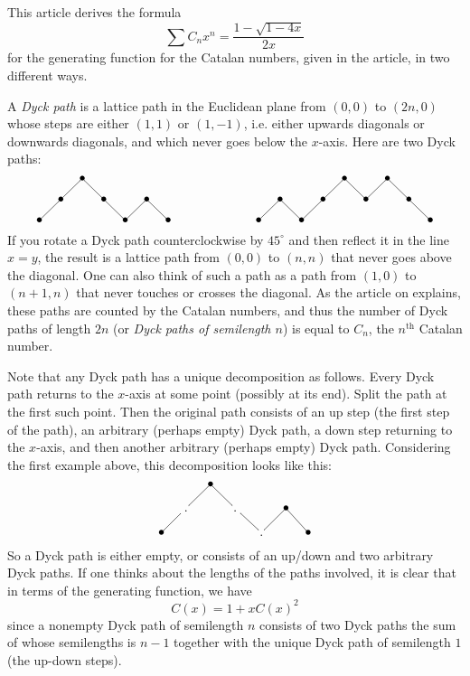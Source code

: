 \documentclass[12pt]{article}
\begin{document}
This article derives the formula
\[\sum C_nx^n=\frac{1-\sqrt{1-4x}}{2x}\]
for the generating function for the Catalan numbers, given in the  article, in two different ways.

A \emph{Dyck path} is a lattice path in the Euclidean plane from $(0,0)$ to $(2n,0)$ whose steps are either $(1,1)$ or $(1,-1)$, i.e. either upwards diagonals or downwards diagonals, and which never goes below the $x$-axis. Here are two Dyck paths:
\[
\mbox{\xy <0cm,.6cm>\entrymodifiers={[o]}\xymatrix @R1pc@C1pc{
&&\bullet \ar@{-}[ld] \ar@{-}[rd]\\
&\bullet \ar@{-}[ld] && \bullet \ar@{-}[rd] &&\bullet \ar@{-}[ld] \ar@{-}[rd]\\
\bullet & & & & \bullet & & \bullet
} \endxy}
\qquad\ \qquad\ \qquad
\mbox{\xy <0cm,.6cm>\entrymodifiers={[o]}\xymatrix @R1pc@C1pc{
&&&&\bullet \ar@{-}[ld] \ar@{-}[rd] && \bullet  \ar@{-}[ld] \ar@{-}[rd]&&\\
&\bullet \ar@{-}[ld] \ar@{-}[rd] && \bullet \ar@{-}[ld]&&\bullet&& \bullet\ar@{-}[rd]&\\
\bullet && \bullet &&&&&& \bullet
} \endxy}
\]
If you rotate a Dyck path counterclockwise by $45^{\circ}$ and then reflect it in the line $x=y$, the result is a lattice path from $(0,0)$ to $(n,n)$ that never goes above the diagonal. One can also think of such a path as a path from $(1,0)$ to $(n+1,n)$ that never touches or crosses the diagonal. As the article on  explains, these paths are counted by the Catalan numbers, and thus the number of Dyck paths of length $2n$ (or \emph{Dyck paths of semilength $n$}) is equal to $C_n$, the $n^{\mathrm{th}}$ Catalan number.

Note that any Dyck path has a unique decomposition as follows. Every Dyck path returns to the $x$-axis at some point (possibly at its end). Split the path at the first such point. Then the original path consists of an up step (the first step of the path), an arbitrary (perhaps empty) Dyck path, a down step returning to the $x$-axis, and then another arbitrary (perhaps empty) Dyck path.
Considering the first example above, this decomposition looks like this:
\[
\mbox{\xy <0cm,.6cm>\xymatrix @R1pc@C1pc{
&&*[o]{\bullet} \ar@{-}[ld] \ar@{-}[rd]\\
&. \ar@{-}[ld] &&.  \ar@{-}[rd] &&*[o]{\bullet} \ar@{-}[ld] \ar@{-}[rd]\\
*[o]{\bullet} & & & & . & & *[o]{\bullet}
} \endxy}
\]
So a Dyck path is either empty, or consists of an up/down and two arbitrary Dyck paths. If one thinks about the lengths of the paths involved, it is clear that in terms of the generating function, we have
\[C(x)=1+xC(x)^2\]
since a nonempty Dyck path of semilength $n$ consists of two Dyck paths the sum of whose semilengths is $n-1$ together with the unique Dyck path of semilength $1$ (the up-down steps).
\end{document}
